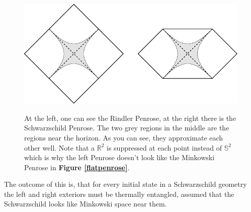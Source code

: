 \begin{figure}[tb]
	\begin{center}
		\includegraphics[scale=1]{rindsch} \label{approximation}
		\caption{At the left, one can see the Rindler Penrose, at the right there is the Schwarzschild Penrose. The two grey regions in the middle are the regions near the horizon. As you can see, they approximate each other well. Note that a $\mathds{R}^2$ is suppressed at each point instead of $\mathds{S}^2$ which is why the left Penrose doesn't look like the Minkowski Penrose in \textbf{Figure \ref{flatpenrose}}.}\label{approximation}
	\end{center}
\end{figure}
The outcome of this is, that for every initial state in a Schwarzschild geometry the left and right exteriors must be thermally entangled, assumed that the Schwarzschild looks like Minkowski space near them. 